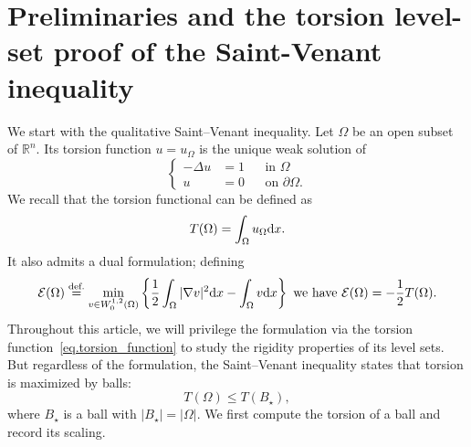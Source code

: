 \documentclass[11pt]{amsart}
\theoremstyle{plain}
\theoremstyle{definition}
\newcommand{\eqdef}{\overset{\text{def.}}{=}}
\def\dd{{\rm d}}
\begin{document}
\section{Preliminaries and the torsion level-set proof of the Saint-Venant inequality}

We start with the qualitative Saint--Venant inequality. Let $\Omega$ be an
open subset of $\mathbb R^n$. Its torsion function $u=u_\Omega$ is the unique
weak solution of
 \begin{equation}\label{eq.torsion_function}
  \left\{
  \begin{aligned}
    -\Delta u &= 1 && \text{in }\Omega\\
    u &= 0 && \text{on }\partial\Omega .
  \end{aligned}
  \right.
\end{equation}
We recall that the torsion functional can be defined as
\begin{equation}
    T(\Omega) = \int_{\Omega} u_\Omega \dd x.
\end{equation}
It also admits a dual formulation; defining
\begin{equation}\label{eq.torsion_dual_formulation}
     \mathcal{E}(\Omega)\eqdef
     \min_{v\in W_0^{1,2}(\Omega)}
     \left\{\frac{1}{2}\int_\Omega|\nabla v|^2\dd x-\int_\Omega v\dd x\right\}
     \text{ we have } 
     \mathcal{E}(\Omega) = - \frac{1}{2} T(\Omega). 
\end{equation}
Throughout this article, we will privilege the formulation via the torsion function~\eqref{eq.torsion_function} to study the rigidity properties of its level sets. But regardless of the formulation, the Saint--Venant inequality states that  torsion is maximized by balls:
\[
   T(\Omega)\le T(B_\star),
\]
where $B_\star$ is a ball with $|B_\star|=|\Omega|$. We first compute the
torsion of a ball and record its scaling.
\end{document}

